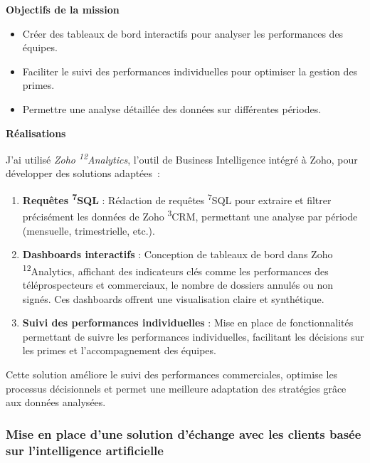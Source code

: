 \textbf{Objectifs de la mission}\vspace{0.3cm}

\begin{itemize}
    \item Créer des tableaux de bord interactifs pour analyser les performances des équipes.\vspace{0.3cm}
    \item Faciliter le suivi des performances individuelles pour optimiser la gestion des primes.\vspace{0.3cm}
    \item Permettre une analyse détaillée des données sur différentes périodes.\vspace{0.3cm}
\end{itemize}

\textbf{Réalisations}\vspace{0.3cm}

J’ai utilisé \textit{Zoho  \textsuperscript{12}Analytics}, l’outil de Business Intelligence intégré à Zoho, pour développer des solutions adaptées~:

\begin{enumerate}
    \item \textbf{Requêtes \textsuperscript{7}SQL} : Rédaction de requêtes \textsuperscript{7}SQL pour extraire et filtrer précisément les données de Zoho \textsuperscript{3}CRM, permettant une analyse par période (mensuelle, trimestrielle, etc.).\vspace{0.3cm}
    \item \textbf{Dashboards interactifs} : Conception de tableaux de bord dans  Zoho \textsuperscript{12}Analytics, affichant des indicateurs clés comme les performances des téléprospecteurs et commerciaux, le nombre de dossiers annulés ou non signés. Ces dashboards offrent une visualisation claire et synthétique.\vspace{0.3cm}
    \item \textbf{Suivi des performances individuelles} : Mise en place de fonctionnalités permettant de suivre les performances individuelles, facilitant les décisions sur les primes et l’accompagnement des équipes.\vspace{0.3cm}
\end{enumerate}

Cette solution améliore le suivi des performances commerciales, optimise les processus décisionnels et permet une meilleure adaptation des stratégies grâce aux données analysées.

\subsubsection{Mise en place d’une solution d’échange avec les clients basée sur l’intelligence artificielle}


